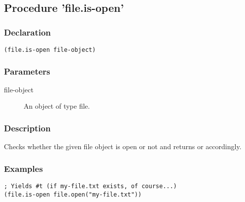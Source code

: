 \subsection{Procedure 'file.is-open'}
\label{builtins/file.is-open}

\subsubsection*{Declaration}
\begin{lstlisting}
(file.is-open file-object)
\end{lstlisting}

\subsubsection*{Parameters}
\begin{description}
	\item[file-object] An object of type file.
\end{description}

\subsubsection*{Description}
Checks whether the given file object is open or not and returns \true{} or \false{} accordingly.

\subsubsection*{Examples}
\begin{lstlisting}
; Yields #t (if my-file.txt exists, of course...)
(file.is-open file.open("my-file.txt"))
\end{lstlisting}
